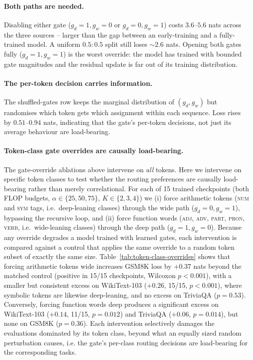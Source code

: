 \documentclass[11pt]{article}
\newcommand{\rev}[1]{{\color{red}#1}}
\begin{document}
\paragraph{Both paths are needed.}
Disabling either gate ($g_d{=}1, g_w{=}0$ or $g_d{=}0, g_w{=}1$)
costs $3.6$--$5.6$ nats across the three sources -- larger than
the gap between an early-training and a fully-trained model.  A
uniform $0.5{:}0.5$ split still loses $\sim 2.6$ nats.  Opening
both gates fully ($g_d{=}1, g_w{=}1$) is the worst override: the
model has trained with bounded gate magnitudes and the residual
update is far out of its training distribution.

\paragraph{The per-token decision carries information.}
The shuffled-gates row keeps the marginal distribution of
$(g_d, g_w)$ but randomises which token gets which assignment
within each sequence.  Loss rises by $0.51$--$0.94$ nats, indicating that the
gate's per-token decisions, not just its average behaviour are
load-bearing.

\rev{\paragraph{Token-class gate overrides are causally load-bearing.}
The gate-override ablations above intervene on \emph{all} tokens. Here we intervene on specific token classes to test whether the routing preferences are causally load-bearing rather than merely correlational. For each of 15 trained checkpoints (both FLOP budgets, $\alpha \in \{25,50,75\}$, $K \in \{2,3,4\}$) we (i) force arithmetic tokens (\textsc{num} and \textsc{sym} tags, i.e.\ deep-leaning classes) through the wide path ($g_d{=}0, g_w{=}1$), bypassing the recursive loop, and (ii) force function words (\textsc{adj}, \textsc{adv}, \textsc{part}, \textsc{pron}, \textsc{verb}, i.e.\ wide-leaning classes) through the deep path ($g_d{=}1, g_w{=}0$). Because any override degrades a model trained with learned gates, each intervention is compared against a control that applies the same override to a random token subset of exactly the same size. Table~\ref{tab:token-class-overrides} shows that forcing arithmetic tokens wide increases GSM8K loss by $+0.37$ nats beyond the matched control (positive in 15/15 checkpoints, Wilcoxon $p<0.001$), with a smaller but consistent excess on WikiText-103 ($+0.26$, 15/15, $p<0.001$), where symbolic tokens are likewise deep-leaning, and no excess on TriviaQA ($p{=}0.53$). Conversely, forcing function words deep produces a significant excess on WikiText-103 ($+0.14$, 11/15, $p{=}0.012$) and TriviaQA ($+0.06$, $p{=}0.014$), but none on GSM8K ($p{=}0.36$). Each intervention selectively damages the evaluations dominated by its token class, beyond what an equally sized random perturbation causes, i.e. the gate's per-class routing decisions are
load-bearing for the corresponding tasks.}
\end{document}
